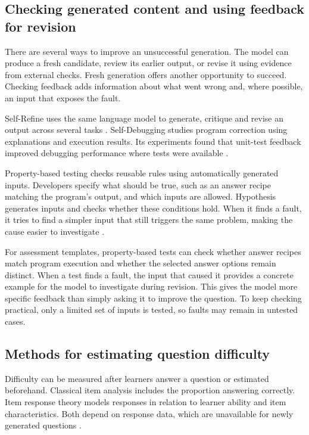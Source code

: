 \subsection{Checking generated content and using feedback for revision}\label{sec:literature-2-3}

There are several ways to improve an unsuccessful generation. The model can produce a fresh candidate, review its earlier output, or revise it using evidence from external checks. Fresh generation offers another opportunity to succeed. Checking feedback adds information about what went wrong and, where possible, an input that exposes the fault.

Self-Refine uses the same language model to generate, critique and revise an output across several tasks \parencite{madaan2023}. Self-Debugging studies program correction using explanations and execution results. Its experiments found that unit-test feedback improved debugging performance where tests were available \parencite{chen2024}.

Property-based testing checks reusable rules using automatically generated inputs. Developers specify what should be true, such as an answer recipe matching the program’s output, and which inputs are allowed. Hypothesis generates inputs and checks whether these conditions hold. When it finds a fault, it tries to find a simpler input that still triggers the same problem, making the cause easier to investigate \parencite{maciver2019}.

For assessment templates, property-based tests can check whether answer recipes match program execution and whether the selected answer options remain distinct. When a test finds a fault, the input that caused it provides a concrete example for the model to investigate during revision. This gives the model more specific feedback than simply asking it to improve the question. To keep checking practical, only a limited set of inputs is tested, so faults may remain in untested cases.

\subsection{Methods for estimating question difficulty}\label{sec:literature-2-4}

Difficulty can be measured after learners answer a question or estimated beforehand. Classical item analysis includes the proportion answering correctly. Item response theory models responses in relation to learner ability and item characteristics. Both depend on response data, which are unavailable for newly generated questions \parencite{nbme2024,brant2026}.

